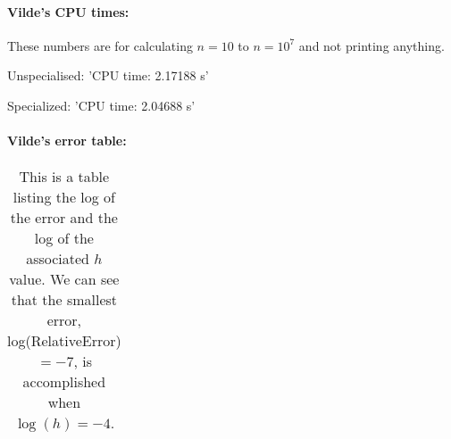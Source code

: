 \paragraph{Vilde's CPU times:\hspace{4cm}}

\hspace{1cm}\linebreak

These numbers are for calculating $n = 10$ to $n = 10^7$ and not printing anything.

Unspecialised: 'CPU time: 2.17188 s'

Specialized: 'CPU time: 2.04688 s'

\paragraph{Vilde's error table:\hspace{4cm}}

\hspace{1cm}\linebreak

\begin{table}[H]\caption{This is a table listing the log of the error and the log of the associated $h$ value. We can see that the smallest error, log(RelativeError) $= -7$, is accomplished when $\log(h) = -4$.}
\begin{tabular}{cc}

\end{tabular}
\end{table}
